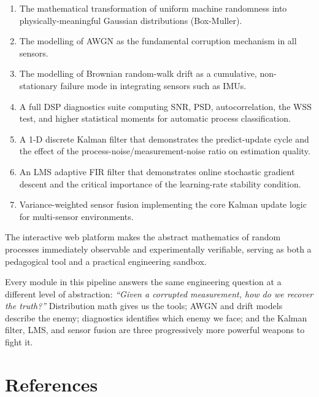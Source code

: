 \documentclass[12pt, a4paper]{article}
\begin{document}
\begin{enumerate}[label=\arabic*.]
  \item The mathematical transformation of uniform machine randomness into
        physically-meaningful Gaussian distributions (Box-Muller).
  \item The modelling of AWGN as the fundamental corruption mechanism in all sensors.
  \item The modelling of Brownian random-walk drift as a cumulative, non-stationary
        failure mode in integrating sensors such as IMUs.
  \item A full DSP diagnostics suite computing SNR, PSD, autocorrelation, the WSS
        test, and higher statistical moments for automatic process classification.
  \item A 1-D discrete Kalman filter that demonstrates the predict-update cycle and
        the effect of the process-noise/measurement-noise ratio on estimation quality.
  \item An LMS adaptive FIR filter that demonstrates online stochastic gradient descent
        and the critical importance of the learning-rate stability condition.
  \item Variance-weighted sensor fusion implementing the core Kalman update logic for
        multi-sensor environments.
\end{enumerate}

The interactive web platform makes the abstract mathematics of random processes
immediately observable and experimentally verifiable, serving as both a pedagogical
tool and a practical engineering sandbox.

\vspace{2em}

\begin{tcolorbox}[colback=accent!5!white, colframe=accent, title=\textbf{Key Insight}]
  Every module in this pipeline answers the same engineering question at a different
  level of abstraction: \emph{``Given a corrupted measurement, how do we recover the
  truth?''} Distribution math gives us the tools; AWGN and drift models describe the
  enemy; diagnostics identifies which enemy we face; and the Kalman filter, LMS, and
  sensor fusion are three progressively more powerful weapons to fight it.
\end{tcolorbox}

\section*{References}
\end{document}
